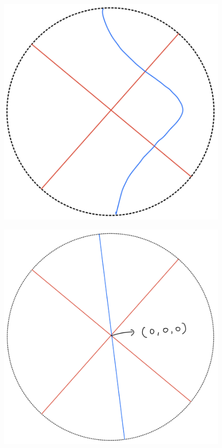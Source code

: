 \begin{definition}
\begin{enumerate}
\begin{itemize}
\begin{figure}[H]
    \centering
    \includegraphics[scale = 0.95]{diagrams/lemma4/16.png}
    \caption{}
    \label{fig:your-label}
\end{figure}
\begin{figure}[H]
    \centering
    \includegraphics[scale = 0.95]{diagrams/lemma4/17.png}

\end{figure}
\end{itemize}
\end{enumerate}
\end{definition}
